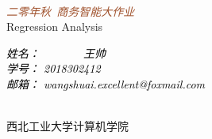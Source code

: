\documentclass{ctexart}
\newcommand*{\plogo}{\fbox{$\mathcal{PL}$}} %
\begin{document}


\begin{titlepage} %
	
	\centering %
	
	
	\setlength{\unitlength}{0.6\textwidth} %
	
	{\color{LightGoldenrod}}\\[\baselineskip] %
	
	\textcolor{Sienna}{\textit{\Huge 二零年秋\ 商务智能大作业}}\\[\baselineskip] %
	
	{\color{RosyBrown}\Large Regression Analysis }\\ %
	
	{\color{LightGoldenrod}} %
	
	\vfill %
	
\textcolor{black}{\textit{\Large 姓名： \ \ \ \ \ \ \        王帅\ \ \ \ \ \ }}\\[\baselineskip] %
\textcolor{black}{\textit{\Large 学号： 2018302412}}\\[\baselineskip] %
\textcolor{black}{\textit{ 邮箱： wangshuai.excellent@foxmail.com}}\\[\baselineskip] %
	\vfill %
	
	
	\plogo\\[0.5\baselineskip] %
	
	西北工业大学计算机学院 %
	
\end{titlepage}
\end{document}
